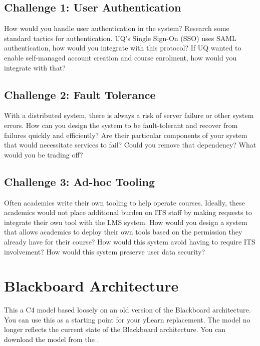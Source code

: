 \documentclass{csse4400}
\begin{document}
\subsection*{Challenge 1: User Authentication}
How would you handle user authentication in the system?
Research some standard tactics for authentication.
UQ's Single Sign-On (SSO) uses SAML authentication,
how would you integrate with this protocol?
If UQ wanted to enable self-managed account creation and course enrolment,
how would you integrate with that?

\subsection*{Challenge 2: Fault Tolerance}
With a distributed system,
there is always a risk of server failure or other system errors.
How can you design the system to be fault-tolerant and recover from failures quickly and efficiently?
Are their particular components of your system that would necessitate services to fail?
Could you remove that dependency?
What would you be trading off?

\subsection*{Challenge 3: Ad-hoc Tooling}
Often academics write their own tooling to help operate courses.
Ideally, these academics would not place additional burden on ITS staff by making requests to integrate their own tool with the LMS system.
How would you design a system that allows academics to deploy their own tools based on the permission they already have for their course?
How would this system avoid having to require ITS involvement?
How would this system preserve user data security?


\appendix

\section{Blackboard Architecture}
This a C4 model based loosely on an old version of the Blackboard architecture.
You can use this as a starting point for your yLearn replacement.
The model no longer reflects the current state of the Blackboard architecture.
You can download the model from the .
\end{document}
